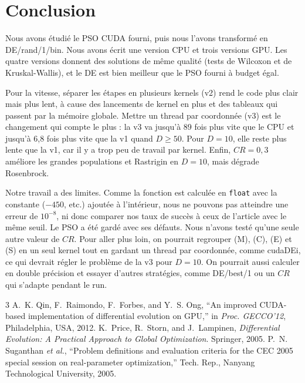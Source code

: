 \documentclass[conference]{IEEEtran}
\begin{document}


\section{Conclusion}
Nous avons \'etudi\'e le PSO CUDA fourni, puis nous l'avons transform\'e en DE/rand/1/bin. Nous avons \'ecrit une version CPU et trois versions GPU. Les quatre versions donnent des solutions de m\^eme qualit\'e (tests de Wilcoxon et de Kruskal-Wallis), et le DE est bien meilleur que le PSO fourni \`a budget \'egal.

Pour la vitesse, s\'eparer les \'etapes en plusieurs kernels (v2) rend le code plus clair mais plus lent, \`a cause des lancements de kernel en plus et des tableaux qui passent par la m\'emoire globale. Mettre un thread par coordonn\'ee (v3) est le changement qui compte le plus : la v3 va jusqu'\`a 89 fois plus vite que le CPU et jusqu'\`a 6,8 fois plus vite que la v1 quand $D\ge50$. Pour $D=10$, elle reste plus lente que la v1, car il y a trop peu de travail par kernel. Enfin, $CR=0{,}3$ am\'eliore les grandes populations et Rastrigin en $D=10$, mais d\'egrade Rosenbrock.

Notre travail a des limites. Comme la fonction est calcul\'ee en \texttt{float} avec la constante ($-450$, etc.) ajout\'ee \`a l'int\'erieur, nous ne pouvons pas atteindre une erreur de $10^{-8}$, ni donc comparer nos taux de succ\`es \`a ceux de l'article avec le m\^eme seuil. Le PSO a \'et\'e gard\'e avec ses d\'efauts. Nous n'avons test\'e qu'une seule autre valeur de $CR$. Pour aller plus loin, on pourrait regrouper (M), (C), (E) et (S) en un seul kernel tout en gardant un thread par coordonn\'ee, comme cudaDEi, ce qui devrait r\'egler le probl\`eme de la v3 pour $D=10$. On pourrait aussi calculer en double pr\'ecision et essayer d'autres strat\'egies, comme DE/best/1 ou un $CR$ qui s'adapte pendant le run.

\begin{thebibliography}{3}
 A.~K. Qin, F.~Raimondo, F.~Forbes, and Y.~S. Ong, ``An improved CUDA-based implementation of differential evolution on GPU,'' in \emph{Proc. GECCO'12}, Philadelphia, USA, 2012.
 K.~Price, R.~Storn, and J.~Lampinen, \emph{Differential Evolution: A Practical Approach to Global Optimization}. Springer, 2005.
 P.~N. Suganthan \emph{et al.}, ``Problem definitions and evaluation criteria for the CEC 2005 special session on real-parameter optimization,'' Tech. Rep., Nanyang Technological University, 2005.
\end{thebibliography}
\end{document}
